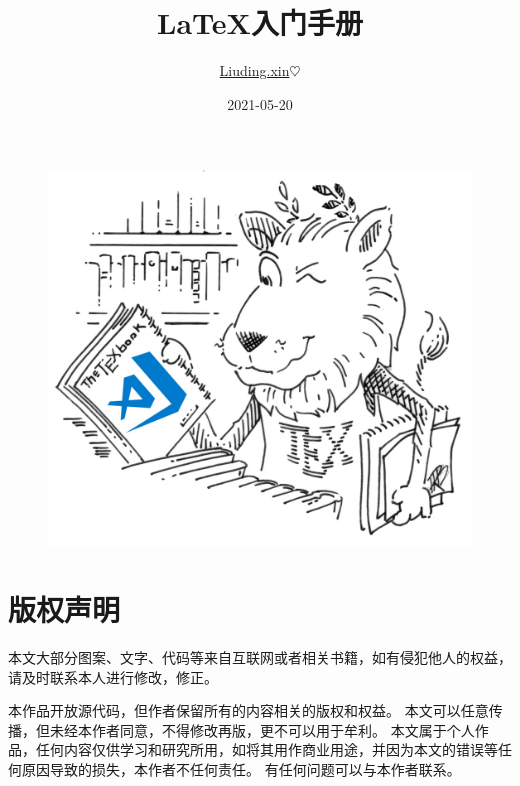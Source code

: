 \documentclass[UTF8,AutoFakeBold]{ctexart}
\numberwithin{figure}{section}
\numberwithin{table}{section}
\begin{document}
\title{ \LaTeX 入门手册}
\author{ \href{http://www.liuding.xin}{Liuding.xin}$\heartsuit$}
\date{2021-05-20}


\begin{titlepage}
    \maketitle %
    \begin{figure}[htbp]
        \centering
        \includegraphics[center, scale=0.4]{images/vscode_latex.jpg}
        \label{cover_pic}
    \end{figure}
\end{titlepage}

\section*{版权声明}

本文大部分图案、文字、代码等来自互联网或者相关书籍，如有侵犯他人的权益，请及时联系本人进行修改，修正。

本作品开放源代码，但作者保留所有的内容相关的版权和权益。 本文可以任意传播，但未经本作者同意，不得修改再版，更不可以用于牟利。 本文属于个人作品，任何内容仅供学习和研究所用，如将其用作商业用途，并因为本文的错误等任何原因导致的损失，本作者不任何责任。 有任何问题可以与本作者联系。
\clearpage
\begin{multicols}{2}

    \tableofcontents

    \listoffigures

    \listoftables


\end{multicols}
\end{document}
